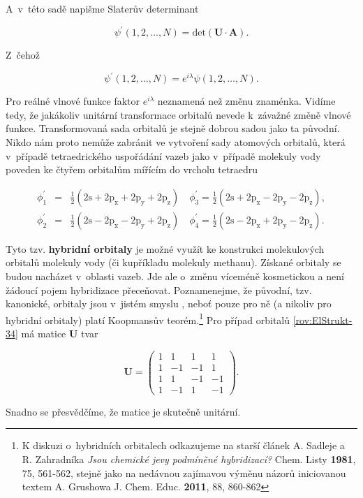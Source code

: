 \noindent A~v~této sadě napišme Slaterův determinant

\begin{equation}
\psi^{\prime}(1,2, \dots, N) = \mbox{det} ( \mathbf{U} \cdot \mathbf{A}).
\label{rov:ElStrukt-32}
\end{equation}

\noindent Z~čehož 

\begin{equation}
\psi^{\prime}(1,2, \dots, N) = e^{i \lambda} \psi(1,2, \dots, N).
\label{rov:ElStrukt-33}
\end{equation}

\noindent Pro reálné vlnové funkce faktor $e^{i\lambda}$  neznamená než změnu znaménka. Vidíme tedy, že jakákoliv unitární transformace orbitalů nevede k~závažné změně vlnové funkce. Transformovaná sada orbitalů je stejně dobrou sadou jako ta původní. Nikdo nám proto nemůže zabránit ve vytvoření sady atomových orbitalů, která v~případě tetraedrického uspořádání vazeb jako v~případě molekuly vody poveden ke čtyřem orbitalům mířícím do vrcholu tetraedru


\begin{eqnarray}
\phi^{\prime}_1 &=& \frac{1}{2} ( 2 \mathrm{s} + 2 \mathrm{p_x} + 2 \mathrm{p_y} + 2 \mathrm{p_z}) \quad \phi^{\prime}_3 = \frac{1}{2} ( 2 \mathrm{s} + 2 \mathrm{p_x} - 2 \mathrm{p_y} - 2 \mathrm{p_z}), \nonumber \\
\phi^{\prime}_2 &=& \frac{1}{2} ( 2 \mathrm{s} - 2 \mathrm{p_x} - 2 \mathrm{p_y} + 2 \mathrm{p_z}) \quad \phi^{\prime}_4 = \frac{1}{2} ( 2 \mathrm{s} - 2 \mathrm{p_x} + 2 \mathrm{p_y} - 2 \mathrm{p_z}).
\label{rov:ElStrukt-34}
\end{eqnarray}


Tyto tzv. \textbf{hybridní orbitaly} je možné využít ke konstrukci molekulových orbitalů molekuly vody (či kupříkladu molekuly methanu). Získané orbitaly se budou nacházet v~oblasti vazeb. Jde ale o~změnu víceméně kosmetickou a není žádoucí pojem hybridizace přeceňovat. Poznamenejme, že původní, tzv. kanonické, orbitaly jsou v~jistém smyslu , neboť pouze pro ně (a nikoliv pro hybridní orbitaly) platí Koopmansův teorém.\footnote{K diskuzi o~hybridních orbitalech odkazujeme na starší článek A. Sadleje a R. Zahradníka \textit{Jsou chemické jevy podmíněné hybridizací?} Chem. Listy \textbf{1981}, 75, 561-562, stejně jako na nedávnou zajímavou výměnu názorů iniciovanou textem A. Grushowa \textit{} J. Chem. Educ. \textbf{2011}, 88, 860-862 } Pro případ orbitalů \eqref{rov:ElStrukt-34} má matice $\mathbf{U}$ tvar

\begin{equation}
\mathbf{U} = 
\begin{pmatrix}
1 & 1 & 1 & 1 \\
1 & -1 & -1 & 1 \\
1 & 1 & -1 & -1\\
1 & -1 & 1 & -1
\end{pmatrix}.
\end{equation}

\noindent Snadno se přesvědčíme, že matice je skutečně unitární.


        
   



      





